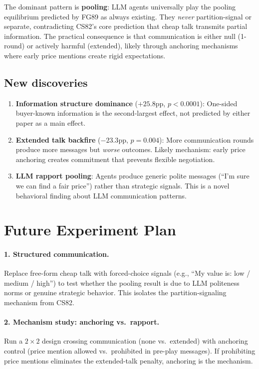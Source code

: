 \documentclass[11pt]{article}
\begin{document}
The dominant pattern is \textbf{pooling}: LLM agents universally play the pooling equilibrium predicted by FG89 as always existing. They \emph{never} partition-signal or separate, contradicting CS82's core prediction that cheap talk transmits partial information. The practical consequence is that communication is either null (1-round) or actively harmful (extended), likely through anchoring mechanisms where early price mentions create rigid expectations.

\subsection{New discoveries}

\begin{enumerate}
\item \textbf{Information structure dominance} ($+25.8$pp, $p < 0.0001$): One-sided buyer-known information is the second-largest effect, not predicted by either paper as a main effect.
\item \textbf{Extended talk backfire} ($-23.3$pp, $p = 0.004$): More communication rounds produce more messages but \emph{worse} outcomes. Likely mechanism: early price anchoring creates commitment that prevents flexible negotiation.
\item \textbf{LLM rapport pooling}: Agents produce generic polite messages (``I'm sure we can find a fair price'') rather than strategic signals. This is a novel behavioral finding about LLM communication patterns.
\end{enumerate}

\section{Future Experiment Plan}

\paragraph{1. Structured communication.} Replace free-form cheap talk with forced-choice signals (e.g., ``My value is: low / medium / high'') to test whether the pooling result is due to LLM politeness norms or genuine strategic behavior. This isolates the partition-signaling mechanism from CS82.

\paragraph{2. Mechanism study: anchoring vs.\ rapport.} Run a $2 \times 2$ design crossing communication (none vs.\ extended) with anchoring control (price mention allowed vs.\ prohibited in pre-play messages). If prohibiting price mentions eliminates the extended-talk penalty, anchoring is the mechanism.
\end{document}
